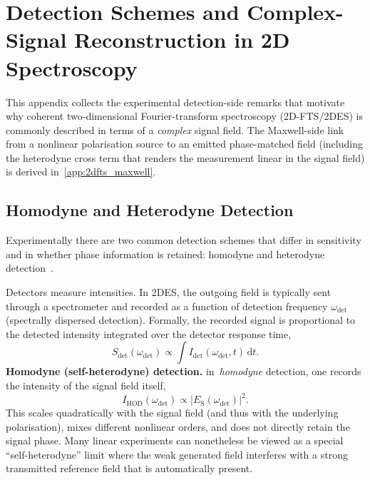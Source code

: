 \chapter{Detection Schemes and Complex-Signal Reconstruction in 2D Spectroscopy}
\label{app:detection_schemes}

This appendix collects the experimental detection-side remarks that motivate why coherent two-dimensional Fourier-transform spectroscopy (2D-FTS/2DES) is commonly described in terms of a \emph{complex} signal field. The Maxwell-side link from a nonlinear polarisation source to an emitted phase-matched field (including the heterodyne cross term that renders the measurement linear in the signal field) is derived in~\autoref{app:2dfts_maxwell}.

\section{Homodyne and Heterodyne Detection}
\label{app:sec:homodyne_heterodyne}

Experimentally there are two common detection schemes that differ in sensitivity and in whether phase information is retained: homodyne and heterodyne detection~\cite{abramaviciusetal2009coherentmultidimensionaloptical}.


Detectors measure intensities. In 2DES, the outgoing field is typically sent through a spectrometer and recorded as a function of detection frequency $\omega_{\mathrm{det}}$ (spectrally dispersed detection). Formally, the recorded signal is proportional to the detected intensity integrated over the detector response time,
\begin{equation}
	S_{\mathrm{det}}(\omega_{\mathrm{det}}) \propto \int I_{\mathrm{det}}(\omega_{\mathrm{det}},t)\,\mathrm{d}t.
	\label{eq:signal_intensity}
\end{equation}
\textbf{Homodyne (self-heterodyne) detection.}
in~\emph{homodyne} detection, one records the intensity of the signal field itself,
\begin{equation}
	I_{\mathrm{HOD}}(\omega_{\mathrm{det}}) \propto \big|E_{\mathrm{S}}(\omega_{\mathrm{det}})\big|^2.
\end{equation}
This scales quadratically with the signal field (and thus with the underlying polarisation), mixes different nonlinear orders, and does not directly retain the signal phase. Many linear experiments can nonetheless be viewed as a special ``self-heterodyne'' limit where the weak generated field interferes with a strong transmitted reference field that is automatically present.

